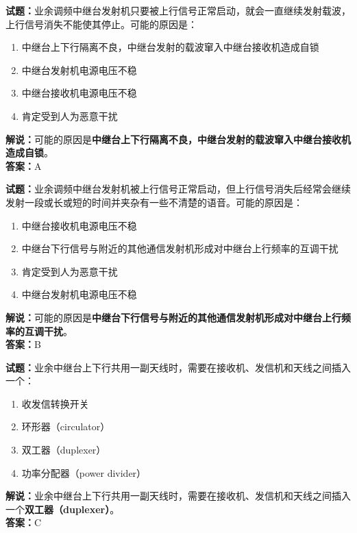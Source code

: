 \documentclass{ctexbook}
\begin{document}
\vspace{1em}

\textbf{试题：}业余调频中继台发射机只要被上行信号正常启动，就会一直继续发射载波，上行信号消失不能使其停止。可能的原因是：
\begin{enumerate}[leftmargin=3em]
  \item 中继台上下行隔离不良，中继台发射的载波窜入中继台接收机造成自锁
  \item 中继台发射机电源电压不稳
  \item 中继台接收机电源电压不稳
  \item 肯定受到人为恶意干扰
\end{enumerate}
\noindent\textbf{解说：}可能的原因是\textbf{中继台上下行隔离不良，中继台发射的载波窜入中继台接收机造成自锁}。\\\noindent\textbf{答案：}A

\vspace{1em}

\textbf{试题：}业余调频中继台发射机被上行信号正常启动，但上行信号消失后经常会继续发射一段或长或短的时间并夹杂有一些不清楚的语音。可能的原因是：
\begin{enumerate}[leftmargin=3em]
  \item 中继台接收机电源电压不稳
  \item 中继台下行信号与附近的其他通信发射机形成对中继台上行频率的互调干扰
  \item 肯定受到人为恶意干扰
  \item 中继台发射机电源电压不稳
\end{enumerate}
\noindent\textbf{解说：}可能的原因是\textbf{中继台下行信号与附近的其他通信发射机形成对中继台上行频率的互调干扰}。\\\noindent\textbf{答案：}B

\vspace{1em}

\textbf{试题：}业余中继台上下行共用一副天线时，需要在接收机、发信机和天线之间插入一个：
\begin{enumerate}[leftmargin=3em]
  \item 收发信转换开关
  \item 环形器（circulator）
  \item 双工器（duplexer）
  \item 功率分配器（power divider）
\end{enumerate}
\noindent\textbf{解说：}业余中继台上下行共用一副天线时，需要在接收机、发信机和天线之间插入一个\textbf{双工器（duplexer）}。\\\noindent\textbf{答案：}C
\end{document}
